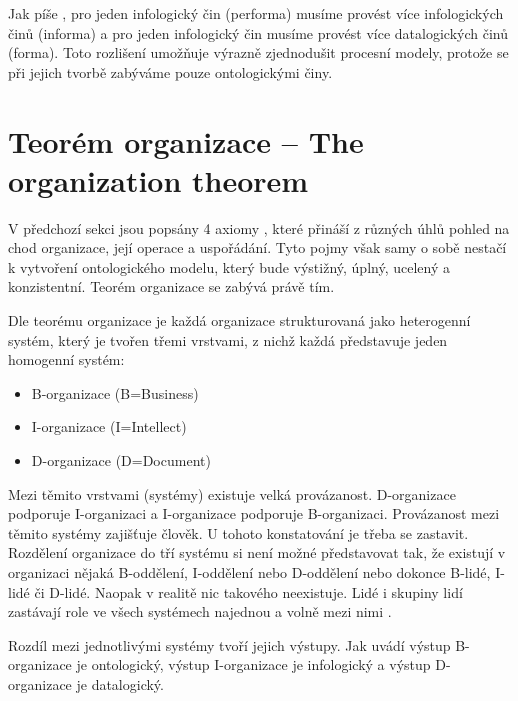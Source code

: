 Jak píše \cite{Vejrazkova2013}, pro jeden infologický čin (performa) musíme provést více infologických činů (informa) a pro jeden infologický čin musíme provést více datalogických činů (forma). Toto rozlišení umožňuje výrazně zjednodušit procesní modely, protože se při jejich tvorbě zabýváme pouze ontologickými činy.

\section{Teorém organizace – The organization theorem}

V předchozí sekci jsou popsány 4 axiomy \ptheory, které přináší z různých úhlů pohled na chod organizace, její operace a uspořádání. Tyto pojmy však samy o sobě nestačí k vytvoření ontologického modelu, který bude výstižný, úplný, ucelený a konzistentní. Teorém organizace se zabývá právě tím.

Dle teorému organizace je každá organizace strukturovaná jako heterogenní systém, který je tvořen třemi vrstvami, z nichž každá představuje jeden homogenní systém: \cite{Dietz2006}

\begin{itemize}
\item B-organizace (B=Business)
\item I-organizace (I=Intellect)
\item D-organizace (D=Document)
\end{itemize}

Mezi těmito vrstvami (systémy) existuje velká provázanost. D-organizace podporuje I-organizaci a I-organizace podporuje B-organizaci. Provázanost mezi těmito systémy zajišťuje člověk. U tohoto konstatování je třeba se zastavit. Rozdělení organizace do tří systému si není možné představovat tak, že existují v organizaci nějaká B-oddělení, I-oddělení nebo D-oddělení nebo dokonce B-lidé, I-lidé či D-lidé. Naopak v realitě nic takového neexistuje. Lidé i skupiny lidí zastávají role ve všech systémech najednou a volně mezi nimi .

Rozdíl mezi jednotlivými systémy tvoří jejich výstupy. Jak uvádí \cite{Dietz2006} výstup B-organizace je ontologický, výstup I-organizace je infologický a výstup D-organizace je datalogický.

